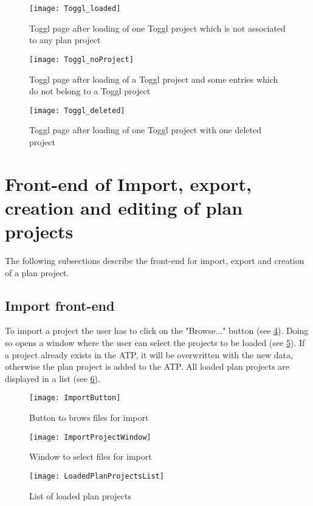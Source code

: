 \begin{figure}[H]
	\centering
	\texttt{[image: Toggl\_loaded]}
	\caption{Toggl page after loading of one Toggl project which is not associated to any plan project}
	\label{Toggl loaded}
\end{figure}

\begin{figure}[H]
	\centering
	\texttt{[image: Toggl\_noProject]}
	\caption{Toggl page after loading of a Toggl project and some entries which do not belong to a Toggl project}
	\label{Toggl no project}
\end{figure}

\begin{figure}[H]
	\centering
	\texttt{[image: Toggl\_deleted]}
	\caption{Toggl page after loading of one Toggl project with one deleted project}
	\label{Toggl deleted}
\end{figure}

\section{Front-end of Import, export, creation and editing of plan projects}
The following subsections describe the front-end for import, export and creation of a plan project.

\subsection{Import front-end}
 To import a project the user has to click on the "Browse..." button (see \ref{importButton}). Doing so opens a window where the user can select the projects to be loaded (see \ref{importWindow}). If a project already exists in the ATP, it will be overwritten with the new data, otherwise the plan project is added to the ATP. All loaded plan projects are displayed in a list (see \ref{loadedPlanProjects}).
\begin{figure}[H]
	\centering
	\texttt{[image: ImportButton]}
	\caption{Button to brows files for import}
	\label{importButton}
\end{figure}
\begin{figure}[H]
	\centering
	\texttt{[image: ImportProjectWindow]}
	\caption{Window to select files for import}
	\label{importWindow}
\end{figure}
\begin{figure}[H]
	\centering
	\texttt{[image: LoadedPlanProjectsList]}
	\caption{List of loaded plan projects}
	\label{loadedPlanProjects}
\end{figure}

